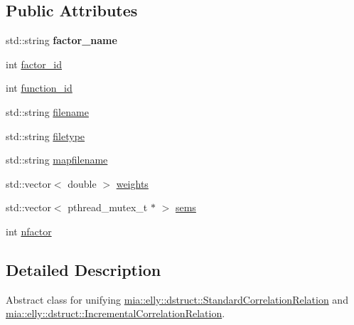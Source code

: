 \subsection*{Public Attributes}
\begin{DoxyCompactItemize}
\item 
\hypertarget{classmia_1_1elly_1_1dstruct_1_1_abstract_correlation_relation_a800bb55573026e2826af0a1326ceb401}{std\-::string {\bfseries factor\-\_\-name}}\label{classmia_1_1elly_1_1dstruct_1_1_abstract_correlation_relation_a800bb55573026e2826af0a1326ceb401}

\item 
int \hyperlink{classmia_1_1elly_1_1dstruct_1_1_abstract_correlation_relation_a3747a084efa5095d4808819bb012ae65}{factor\-\_\-id}
\item 
int \hyperlink{classmia_1_1elly_1_1dstruct_1_1_abstract_correlation_relation_ac7216c599394d0b1026bb4f7a161f6a4}{function\-\_\-id}
\item 
std\-::string \hyperlink{classmia_1_1elly_1_1dstruct_1_1_abstract_correlation_relation_a21e302ad723c9e0c99eb81c5bc420779}{filename}
\item 
std\-::string \hyperlink{classmia_1_1elly_1_1dstruct_1_1_abstract_correlation_relation_ae96b4f7de4d2e53b3a3ea38b14e90838}{filetype}
\item 
std\-::string \hyperlink{classmia_1_1elly_1_1dstruct_1_1_abstract_correlation_relation_a528970ab644de5fa8958bc8b26917664}{mapfilename}
\item 
std\-::vector$<$ double $>$ \hyperlink{classmia_1_1elly_1_1dstruct_1_1_abstract_correlation_relation_a8a094d32441aca190c2ab019407de95a}{weights}
\item 
std\-::vector$<$ pthread\-\_\-mutex\-\_\-t $\ast$ $>$ \hyperlink{classmia_1_1elly_1_1dstruct_1_1_abstract_correlation_relation_a10a0c3ac052768f044f4c0a7da5f2a80}{sems}
\item 
int \hyperlink{classmia_1_1elly_1_1dstruct_1_1_abstract_correlation_relation_a65756a92a296e0e9041b043cee64d8b0}{nfactor}
\end{DoxyCompactItemize}


\subsection{Detailed Description}
Abstract class for unifying \hyperlink{classmia_1_1elly_1_1dstruct_1_1_standard_correlation_relation}{mia\-::elly\-::dstruct\-::\-Standard\-Correlation\-Relation} and \hyperlink{classmia_1_1elly_1_1dstruct_1_1_incremental_correlation_relation}{mia\-::elly\-::dstruct\-::\-Incremental\-Correlation\-Relation}. 

